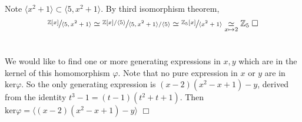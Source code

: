 \documentclass{article}
\begin{document}
\section{}
Note $\langle x^2+1 \rangle \subset \langle 5,x^2+1 \rangle$. By third isomorphism theorem,
$$\sfrac{\mathbb{Z}[x]}{\langle 5,x^2+1 \rangle} \simeq \sfrac{\mathbb{Z}[x]/\langle 5 \rangle}{\langle 5,x^2+1 \rangle / \langle 5 \rangle} \simeq \sfrac{\mathbb{Z}_5[x]}{\langle x^2+1 \rangle} \underset{x \mapsto 2}{\simeq} \mathbb{Z}_5 \; \Box$$

\section{}
We would like to find one or more generating expressions in $x,y$ which are in the kernel of this homomorphism $\varphi$. Note that no pure expression in $x$ or $y$ are in $\mathrm{ker}\varphi$. So the only generating expression is $(x-2)(x^2-x+1)-y$, derived from the identity $t^3-1 = (t-1)(t^2+t+1)$. Then $\mathrm{ker}\varphi = \langle (x-2)(x^2-x+1)-y \rangle$ $\Box$
\end{document}
